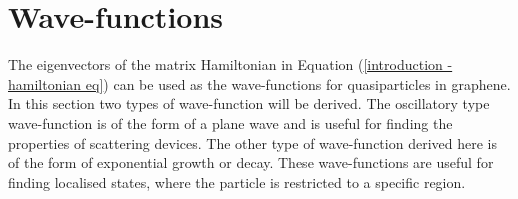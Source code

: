 
	\section{Wave-functions}
	\label{Wave-functions}
		The eigenvectors of the matrix Hamiltonian in Equation (\ref{introduction - hamiltonian eq}) can be used as the wave-functions for quasiparticles in graphene. In this section two types of wave-function will be derived. The oscillatory type wave-function is of the form of a plane wave and is useful for finding the properties of scattering devices. The other type of wave-function derived here is of the form of exponential growth or decay. These wave-functions are useful for finding localised states, where the particle is restricted to a specific region.
